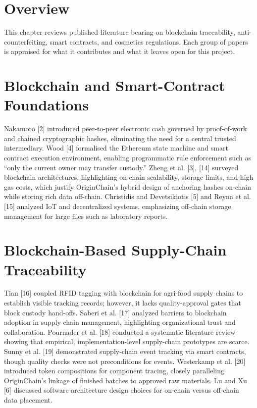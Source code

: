 \documentclass[12pt,a4paper]{report}
\begin{document}
\section{Overview}
This chapter reviews published literature bearing on blockchain traceability, anti-counterfeiting, smart contracts, and cosmetics regulations. Each group of papers is appraised for what it contributes and what it leaves open for this project.

\section{Blockchain and Smart-Contract Foundations}
Nakamoto [2] introduced peer-to-peer electronic cash governed by proof-of-work and chained cryptographic hashes, eliminating the need for a central trusted intermediary. Wood [4] formalised the Ethereum state machine and smart contract execution environment, enabling programmatic rule enforcement such as ``only the current owner may transfer custody.'' Zheng et al. [3], [14] surveyed blockchain architectures, highlighting on-chain scalability, storage limits, and high gas costs, which justify OriginChain's hybrid design of anchoring hashes on-chain while storing rich data off-chain. Christidis and Devetsikiotis [5] and Reyna et al. [15] analyzed IoT and decentralized systems, emphasizing off-chain storage management for large files such as laboratory reports.

\section{Blockchain-Based Supply-Chain Traceability}
Tian [16] coupled RFID tagging with blockchain for agri-food supply chains to establish visible tracking records; however, it lacks quality-approval gates that block custody hand-offs. Saberi et al. [17] analyzed barriers to blockchain adoption in supply chain management, highlighting organizational trust and collaboration. Pournader et al. [18] conducted a systematic literature review showing that empirical, implementation-level supply-chain prototypes are scarce. Sunny et al. [19] demonstrated supply-chain event tracking via smart contracts, though quality checks were not preconditions for events. Westerkamp et al. [20] introduced token compositions for component tracing, closely paralleling OriginChain's linkage of finished batches to approved raw materials. Lu and Xu [6] discussed software architecture design choices for on-chain versus off-chain data placement.
\end{document}
